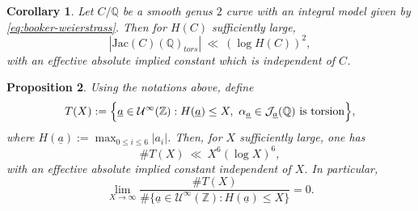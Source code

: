 \documentclass{amsart}
\newcommand{\Q}{{\mathbb Q}}
\newcommand{\Z}{{\mathbb Z}}
\newcommand{\cJ}{\mathcal{J}}
\newcommand{\cU}{\mathcal{U}}
\newcommand{\Jac}{\mathrm{Jac}}
\newcommand{\Ht}{H}
\newcommand{\ua}{\underline{a}}
\newtheorem{proposition}{Proposition}[section]
\newtheorem{corollary}[proposition]{Corollary}
\begin{document}
\begin{corollary}\label{cor:torsion-logH}
Let $C/\Q$ be a smooth genus $2$ curve with an integral model
given by \eqref{eq:booker-weierstrass}. 
Then for $H(C)$ sufficiently large,
\[
|\Jac(C)(\Q)_{tors}|\ \ll\ (\log H(C))^2,
\]
with an effective absolute implied constant which is independent of $C$.
\end{corollary}


\begin{proposition}\label{prop:torsionlocus}
Using the notations above, define
\[
T(X):=\Bigl\{\ua \in \cU^{\infty}(\mathbb Z): \Ht(\ua)\le X,\ \alpha_{\ua} \in \cJ_{\ua}(\Q)\ \text{is torsion}\Bigr\},
\]
where $\Ht(\ua):=\max_{0\le i\le 6}|a_{i}|$.
Then, for $X$ sufficiently large, one has
\[
\#T(X)\ \ll\ X^{6}(\log X)^{6},
\]
with an effective absolute implied constant independent of $X$. In particular,
\[
\lim_{X \to \infty} \frac{\#T(X)}{\#\{\ua \in \cU^{\infty}(\Z):\Ht(\ua)\le X\}} = 0.
\]
\end{proposition}
\end{document}
